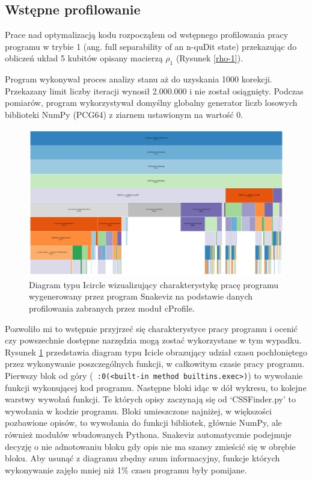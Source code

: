 \documentclass[11pt, a4paper]{article}
\newcommand{\code}[1]{\texttt{#1}}
\begin{document}
\begin{sloppypar}
    \subsection{Wstępne profilowanie}
    Prace nad optymalizacją kodu rozpocząłem od wstępnego profilowania pracy programu w
    trybie 1 (ang. full separability of an n-quDit state) przekazując do obliczeń układ 5
    kubitów opisany macierzą $\rho_{1}$ (Rysunek \ref{rho-1}).

    Program wykonywał proces analizy stanu aż do uzyskania 1000 korekcji. Przekazany
    limit liczby iteracji wynosił 2.000.000 i nie został osiągnięty. Podczas pomiarów, program
    wykorzystywał domyślny globalny generator liczb losowych biblioteki NumPy (PCG64\cite{NumpyDefaultGenerator})
    z ziarnem ustawionym na wartość 0.

    \begin{figure}[ht]
      \centering
      \includegraphics[width=1.0\textwidth]{"resources/profiling_1/graph.png"}
      \caption{Diagram typu Icircle wizualizujący charakterystykę pracę programu wygenerowany przez program Snakeviz na podstawie danych profilowania zabranych przez moduł cProfile.}
      \label{pre-prof-perf}
    \end{figure}

    Pozwoliło mi to wstępnie przyjrzeć się charakterystyce pracy programu i ocenić czy
    powszechnie dostępne narzędzia mogą zostać wykorzystane w tym wypadku. Rysunek \ref{pre-prof-perf}
    przedstawia diagram typu Icicle obrazujący udział czasu pochłoniętego przez wykonywanie
    poszczególnych funkcji, w całkowitym czasie pracy programu. Pierwszy blok od góry (\code{~:0(<built-in method builtins.exec>)})
    to wywołanie funkcji wykonującej kod programu. Następne bloki idąc w dół wykresu, to
    kolejne warstwy wywołań funkcji. Te których opisy zaczynają się od `CSSFinder.py' to
    wywołania w kodzie programu. Bloki umieszczone najniżej, w większości pozbawione opisów,
    to wywołania do funkcji bibliotek, głównie NumPy, ale również modułów wbudowanych
    Pythona. Snakeviz automatycznie podejmuje decyzję o nie adnotowaniu bloku gdy opis nie
    ma szansy zmieścić się w obrębie bloku. Aby usunąć z diagramu zbędny szum
    informacyjny, funkcje których wykonywanie zajęło mniej niż 1\% czasu programu były
    pomijane.


\end{sloppypar}
\end{document}
